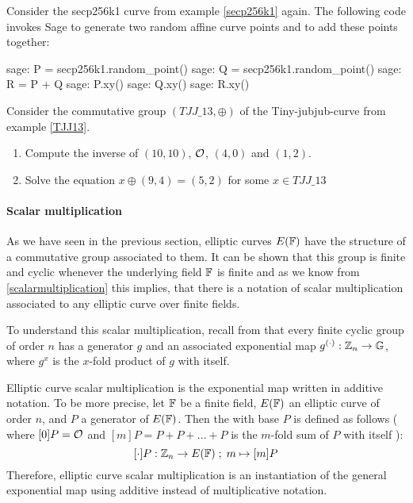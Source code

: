 \begin{example}
Consider the secp256k1 curve from example \ref{secp256k1} again. The following code invokes Sage to generate two random affine curve points and to add these points together: 
\begin{sagecommandline}
sage: P = secp256k1.random_point()
sage: Q = secp256k1.random_point()
sage: R = P + Q
sage: P.xy()
sage: Q.xy()
sage: R.xy()
\end{sagecommandline}
\end{example}
\begin{exercise}
Consider the commutative group $(\mathit{TJJ\_13},\oplus)$ of the Tiny-jubjub-curve from example \ref{TJJ13}. 
\begin{enumerate}
\item Compute the inverse of $(10,10)$, $\mathcal{O}$, $(4,0)$ and $(1,2)$.
\item Solve the equation $x \oplus (9,4) = (5,2) $ for some $x\in \mathit{TJJ\_13}$
\end{enumerate}
\end{exercise}

\paragraph{Scalar multiplication}
As we have seen in the previous section, elliptic curves $E(\mathbb{F})$ have the structure of a commutative group associated to them. It can be shown that this group is finite and cyclic whenever the underlying field $\mathbb{F}$ is finite and as we know from \ref{scalarmultiplication} this implies, that there is a notation of scalar multiplication associated to any elliptic curve over finite fields.

To understand this scalar multiplication, recall from \pageref{cyclic-groups} that every finite cyclic group of order $n$ has a generator $g$ and an associated exponential map $g^{(\cdot)}: \mathbb{Z}_n \to \mathbb{G}$, where $g^x$ is the $x$-fold product of $g$ with itself.  

Elliptic curve scalar multiplication is the exponential map written in additive notation. To be more precise, let $\mathbb{F}$ be a finite field, $E(\mathbb{F})$ an elliptic curve of order $n$, and $P$ a generator of $E(\mathbb{F})$. Then the  with base $P$ is defined as follows ( where $[0]P = \mathcal{O}$ and $[m]P = P+P+\ldots + P$ is the $m$-fold sum of $P$ with itself ):
$$
[\cdot]P: \mathbb{Z}_n \to E(\mathbb{F})\;;\; m \mapsto [m]P
$$
Therefore, elliptic curve scalar multiplication is an instantiation of the general exponential map using additive instead of multiplicative notation.


